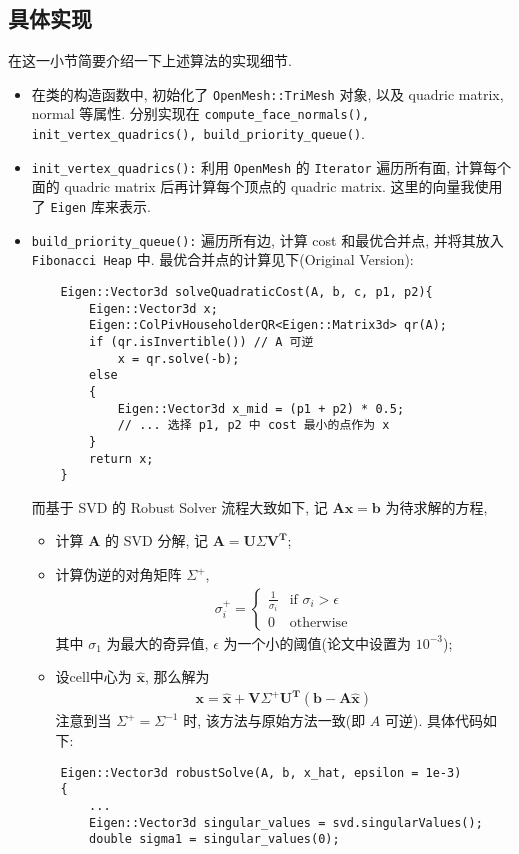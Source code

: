 \documentclass[11pt]{article}
\newcommand\1{\mathds{1}}
\begin{document}
\subsection{具体实现}
在这一小节简要介绍一下上述算法的实现细节. 
\begin{itemize}
    \item 在类的构造函数中, 初始化了 \texttt{OpenMesh::TriMesh} 对象, 以及 quadric matrix, normal 等属性.
    分别实现在 \texttt{compute\_face\_normals(), init\_vertex\_quadrics(), build\_priority\_queue()}.
    \item \texttt{init\_vertex\_quadrics():} 利用 \texttt{OpenMesh} 的 \texttt{Iterator} 遍历所有面, 
    计算每个面的 quadric matrix 后再计算每个顶点的 quadric matrix. 这里的向量我使用了 \texttt{Eigen} 库来表示. 
    \item \texttt{build\_priority\_queue():} 遍历所有边, 计算 cost 和最优合并点, 并将其放入 \texttt{Fibonacci Heap} 中.
    最优合并点的计算见下(Original Version):
    \begin{verbatim}
    Eigen::Vector3d solveQuadraticCost(A, b, c, p1, p2){
        Eigen::Vector3d x;
        Eigen::ColPivHouseholderQR<Eigen::Matrix3d> qr(A);
        if (qr.isInvertible()) // A 可逆
            x = qr.solve(-b);
        else
        {
            Eigen::Vector3d x_mid = (p1 + p2) * 0.5;
            // ... 选择 p1, p2 中 cost 最小的点作为 x
        }
        return x;
    }
    \end{verbatim}
    而基于 SVD 的 Robust Solver 流程大致如下, 记 $\mathbf{Ax = b}$ 为待求解的方程,
    \begin{itemize}
        \item 计算 $\mathbf{A}$ 的 SVD 分解, 记 $\mathbf{A = U} \Sigma \mathbf{V^T}$;
        \item 计算伪逆的对角矩阵 $\Sigma^+$, 
        \begin{align*}
            \sigma_i^+ = \begin{cases}
                \frac{1}{\sigma_i} & \text{if } \sigma_i > \epsilon \\
                0 & \text{otherwise}
            \end{cases}
        \end{align*}
        其中 $\sigma_1$ 为最大的奇异值, $\epsilon$ 为一个小的阈值(论文中设置为 $10^{-3}$);
        \item 设cell中心为 $\hat{\mathbf{x}}$, 那么解为
        \begin{align*}
            \mathbf{x = \hat{x} + V} \Sigma^+ \mathbf{U^T (b - A \hat{x})}
        \end{align*}
        注意到当 $\Sigma^+ = \Sigma^{-1}$ 时, 该方法与原始方法一致(即 $A$ 可逆).
        具体代码如下:
    \end{itemize}
    \begin{verbatim}
    Eigen::Vector3d robustSolve(A, b, x_hat, epsilon = 1e-3) 
    {   
        ...
        Eigen::Vector3d singular_values = svd.singularValues();
        double sigma1 = singular_values(0);


\end{verbatim}
\end{itemize}
\end{document}
